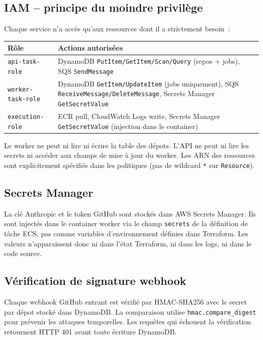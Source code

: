 \documentclass[11pt,a4paper]{article}
\newcommand{\code}[1]{\texttt{#1}}
\begin{document}
\subsection{IAM -- principe du moindre privil\`{e}ge}

Chaque service n'a acc\`{e}s qu'aux ressources dont il a strictement besoin~:

\begin{tabularx}{\linewidth}{lX}
\toprule
R\^{o}le & Actions autoris\'{e}es \\
\midrule
\code{api-task-role} & DynamoDB \code{PutItem/GetItem/Scan/Query} (repos + jobs), SQS \code{SendMessage} \\
\code{worker-task-role} & DynamoDB \code{GetItem/UpdateItem} (jobs uniquement), SQS \code{ReceiveMessage/Delete\-Message}, Secrets Manager \code{GetSecretValue} \\
\code{execution-role} & ECR pull, CloudWatch Logs write, Secrets Manager \code{GetSecretValue} (injection dans le container) \\
\bottomrule
\end{tabularx}

Le worker ne peut ni lire ni \'{e}crire la table des d\'{e}pots. L'API ne peut ni lire les secrets ni acc\'{e}der aux champs de mise \`{a} jour du worker. Les ARN des ressources sont explicitement sp\'{e}cifi\'{e}s dans les politiques (pas de wildcard \code{*} sur \code{Resource}).

\subsection{Secrets Manager}

La cl\'{e} Anthropic et le token GitHub sont stock\'{e}s dans AWS Secrets Manager. Ils sont inject\'{e}s dans le container worker via le champ \code{secrets} de la d\'{e}finition de t\^{a}che ECS, pas comme variables d'environnement d\'{e}finies dans Terraform. Les valeurs n'apparaissent donc ni dans l'\'{e}tat Terraform, ni dans les logs, ni dans le code source.

\subsection{V\'{e}rification de signature webhook}

Chaque webhook GitHub entrant est v\'{e}rifi\'{e} par HMAC-SHA256 avec le secret par d\'{e}pot stock\'{e} dans DynamoDB. La comparaison utilise \code{hmac.compare\_digest} pour pr\'{e}venir les attaques temporelles. Les requ\^{e}tes qui \'{e}chouent la v\'{e}rification retournent HTTP 401 avant toute \'{e}criture DynamoDB.
\end{document}
